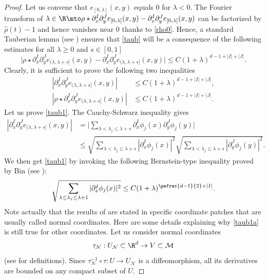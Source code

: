 \begin{proof}
Let us convene that $e_{[0,\lambda]}(x,y)$ equals $0$ for $\lambda<0$.
The Fourier transform of $\lambda\in \R \mto \rho \star \partial_x^I \partial_y^J e_{[0,\lambda]}(x,y)-\partial_x^I \partial_y^J e_{[0,\lambda]}(x,y)$ can be factorized by $\widehat{\rho}(t)-1$ and hence vanishes near $0$ thanks to \eqref{rho0}.
Hence, a standard Tauberian lemma (see \cite[Lem.\,4.2.3, lines (4.2.13) and (4.2.14)]{sogge2017fourier}) ensures that \eqref{taub} will be a consequence of the following estimates for all $\lambda \geq 0$ and $s\in [0,1]$
\begin{equation*}
\bigl|\rho \star \partial_x^I \partial_y^J e_{(\lambda,\lambda+s]}(x,y)-\partial_x^I \partial_y^J e_{(\lambda,\lambda+s]}(x,y)\bigr|\leq C(1+\lambda)^{d-1+|I|+|J|}.
\end{equation*}
Clearly, it is sufficient to prove the following two inequalities
\begin{align}\label{taub1}
|\partial_x^I \partial_y^J e_{(\lambda,\lambda+s]}(x,y)|&\leq C(1+\lambda)^{d-1+|I|+|J|}, \\ \label{taub2}
|\rho \star \partial_x^I \partial_y^J e_{(\lambda,\lambda+s]}(x,y)|&\leq C(1+\lambda)^{d-1+|I|+|J|}.
\end{align}
Let us prove \eqref{taub1}. The Cauchy-Schwarz inequality gives
\begin{align*}
|\partial_x^I \partial_y^J e_{(\lambda,\lambda+s]}(x,y)| & = \biggl\vert \sum_{\lambda<\lambda_j\leq \lambda +s} \partial_x^I \phi_j(x) \partial_y^J \phi_j(y) \biggr\vert \\
& \leq \sqrt{\sum_{\lambda <\lambda_j\leq \lambda+s} |\partial_x^I \phi_j(x)|^2} \sqrt{\sum_{\lambda <\lambda_j\leq \lambda+s} |\partial_y^J \phi_j(y)|^2}.
\end{align*}
We then get \eqref{taub1} by invoking the following Bernstein-type inequality proved by Bin (see \cite[line (11)]{bin2004}):
\begin{equation}\label{taub1a}
\sqrt{\sum_{\lambda \leq \lambda_j\leq \lambda+1} |\partial_x^I \phi_j(x)|^2}\leq C(1+\lambda)^{\psfrac{d-1}{2}+|I|}.
\end{equation}
Note actually that the results of \cite{bin2004} are stated in specific coordinate patches that are usually called normal coordinates. Here are some details explaining why \eqref{taub1a} is still true for other coordinates. Let us consider normal coordinates
\[
\tau_{\mathcal{N}}:U_{\mathcal{N}}\subset \R^d \to V\subset \mathcal{M}
\]
(see \cite{bin2004} for definitions).
Since $\tau_{\mathcal{N}}^{-1}\circ \tau:U\to U_{\mathcal{N}}$ is a diffeomorphism, all its derivatives are bounded on any compact subset of $U$.

\end{proof}
